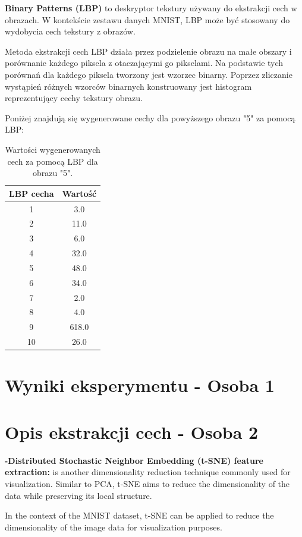 \documentclass[12pt]{article}
\begin{document}
    \textbf{Binary Patterns (LBP)} to deskryptor tekstury używany do ekstrakcji cech w obrazach. W kontekście zestawu danych MNIST, LBP może być stosowany do wydobycia cech tekstury z obrazów.

    Metoda ekstrakcji cech LBP działa przez podzielenie obrazu na małe obszary i porównanie każdego piksela z otaczającymi go pikselami. Na podstawie tych porównań dla każdego piksela tworzony jest wzorzec binarny. Poprzez zliczanie wystąpień różnych wzorców binarnych konstruowany jest histogram reprezentujący cechy tekstury obrazu.

    Poniżej znajdują się wygenerowane cechy dla powyższego obrazu "5" za pomocą LBP:
    \begin{table}[h]
\centering
\begin{tabular}{|c|c|}
\hline
\textbf{LBP cecha} & \textbf{Wartość} \\
\hline
1 & 3.0 \\
2 & 11.0 \\
3 & 6.0 \\
4 & 32.0 \\
5 & 48.0 \\
6 & 34.0 \\
7 & 2.0 \\
8 & 4.0 \\
9 & 618.0 \\
10 & 26.0 \\
\hline
\end{tabular}
\caption{Wartości wygenerowanych cech za pomocą LBP dla obrazu "5".}
\end{table}

    \pagebreak

    \section{Wyniki eksperymentu - Osoba 1}
    \pagebreak

    \section{Opis ekstrakcji cech - Osoba 2}
    \textbf{-Distributed Stochastic Neighbor Embedding (t-SNE) feature extraction:}
    is another dimensionality reduction technique commonly used for visualization. Similar to PCA, t-SNE aims to reduce the dimensionality of the data while preserving its local structure.

    In the context of the MNIST dataset, t-SNE can be applied to reduce the dimensionality of the image data for visualization purposes.
\end{document}
